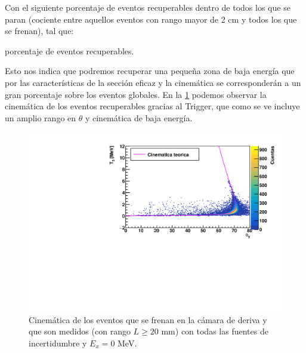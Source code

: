Con el siguiente porcentaje de eventos recuperables dentro de todos los que se paran (cociente entre aquellos eventos con rango mayor de 2 cm y todos los que se frenan), tal que: 


\begin{table}[H] \centering
      
    \caption{porcentaje de eventos recuperables.}
\end{table}

\vspace*{-0.4cm}

Esto nos indica que podremos recuperar una pequeña zona de baja energía que por las características de la sección eficaz y la cinemática se corresponderán a un gran porcentaje sobre los eventos globales. En la \cref{Fig:06-kin-L1} podemos observar la cinemática de los eventos recuperables gracias al Trigger, que como se ve incluye un amplio rango en $\theta$ y cinemática de baja energía.  

\begin{figure}[H] \centering

    \includegraphics[width=0.73\linewidth]{Imagenes/Trigger/EkinMeasuredL1_Ex0.00_incIdx0.pdf}
    \caption{Cinemática de los eventos que se frenan en la cámara de deriva y que son medidos (con rango $L\geq 20$ mm) con todas las fuentes de incertidumbre y $E_x=0$ MeV.}
    \label{Fig:06-kin-L1}
\end{figure}
